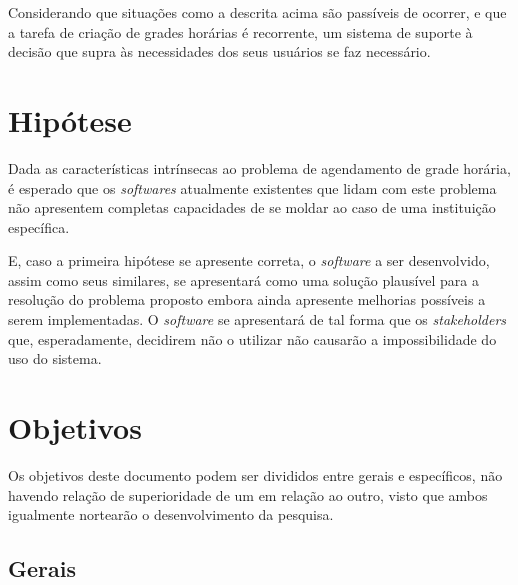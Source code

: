 Considerando que situações como a descrita acima são passíveis de ocorrer, e que a tarefa de criação de grades horárias é recorrente, um sistema de suporte à decisão que supra às necessidades dos seus usuários se faz necessário.

\section{Hipótese} %

Dada as características intrínsecas ao problema de agendamento de grade horária, é esperado que os \textit{softwares} atualmente existentes que lidam com este problema não apresentem completas capacidades de se moldar ao caso de uma instituição específica.

E, caso a primeira hipótese se apresente correta, o \textit{software} a ser desenvolvido, assim como seus similares, se apresentará como uma solução plausível para a resolução do problema proposto embora ainda apresente melhorias possíveis a serem implementadas. O \textit{software} se apresentará de tal forma que os \textit{stakeholders} que, esperadamente, decidirem não o utilizar não causarão a impossibilidade do uso do sistema.


\section{Objetivos} %

Os objetivos deste documento podem ser divididos entre gerais e específicos, não havendo relação de superioridade de um em relação ao outro, visto que ambos igualmente nortearão o desenvolvimento da pesquisa.

\subsection{Gerais} %


